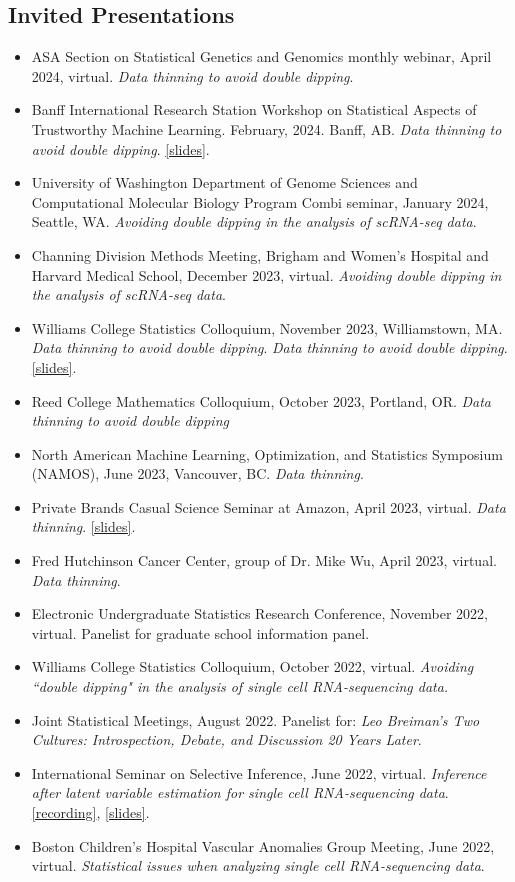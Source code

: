 \documentclass[margin, 10pt]{res}
\begin{document}
\begin{resume}
\section{Invited Presentations} 
\begin{itemize}
\item ASA Section on Statistical Genetics and Genomics monthly webinar, April 2024, virtual. \emph{Data thinning to avoid double dipping}.
\item Banff International Research Station Workshop on Statistical Aspects of Trustworthy Machine Learning. February, 2024. Banff, AB. \emph{Data thinning to avoid double dipping}. \href{https://anna-neufeld.github.io/slides/BIRS.pdf}{[slides]}. 
\item University of Washington Department of Genome Sciences and Computational Molecular Biology Program Combi seminar, January 2024, Seattle, WA. \emph{Avoiding double dipping in the analysis of scRNA-seq data}.
\item Channing Division Methods Meeting, Brigham and Women's Hospital and Harvard Medical School, December 2023, virtual. \emph{Avoiding double dipping in the analysis of scRNA-seq data}.
\item Williams College Statistics Colloquium, November 2023, Williamstown, MA. \emph{Data thinning to avoid double dipping}. \emph{Data thinning to avoid double dipping}. \href{https://anna-neufeld.github.io/slides/jobtalk.pdf}{[slides]}.
\item Reed College Mathematics Colloquium, October 2023, Portland, OR. \emph{Data thinning to avoid double dipping}
\item North American Machine Learning, Optimization, and Statistics Symposium (NAMOS), June 2023, Vancouver, BC. \emph{Data thinning}. 
\item Private Brands Casual Science Seminar at Amazon, April 2023, virtual. \emph{Data thinning}. \href{https://anna-neufeld.github.io/slides/amazon.pdf}{[slides]}. 
\item Fred Hutchinson Cancer Center, group of Dr. Mike Wu, April 2023, virtual. \emph{Data thinning}. 
\item Electronic Undergraduate Statistics Research Conference, November 2022, virtual. Panelist for graduate school information panel. 
\item Williams College Statistics Colloquium, October 2022, virtual. \emph{Avoiding ``double dipping" in the analysis of single cell RNA-sequencing data.} 
\item Joint Statistical Meetings, August 2022. Panelist for: \emph{Leo Breiman's Two Cultures: Introspection, Debate, and Discussion 20 Years Later}. 
\item International Seminar on Selective Inference, June 2022, virtual. \emph{Inference after latent variable estimation for single cell RNA-sequencing data}. \href{https://drive.google.com/file/d/1U4s7xiuz5yOCeDL2hjfIPZPbD7EsmINb/view}{[recording]}, \href{https://drive.google.com/file/d/1KPX8TkT85jHYalxhieyy65PAj18PRbFF/view}{[slides]}.
\item Boston Children's Hospital Vascular Anomalies Group Meeting, June 2022, virtual. \emph{Statistical issues when analyzing single cell RNA-sequencing data}. 
\end{itemize}

\end{resume}
\end{document}

